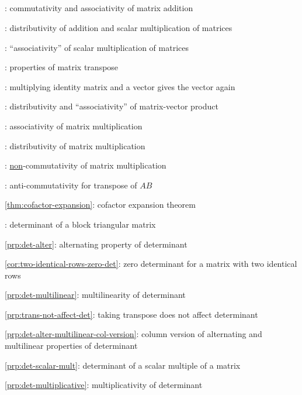 \subsection*{}
\item {}: commutativity and associativity of
matrix addition
\item {}: distributivity of addition
and scalar multiplication of matrices
\item {}: ``associativity'' of scalar multiplication of matrices
\item {}: properties of matrix transpose
\item {}: multiplying identity matrix and a vector gives the vector again
\item {}: distributivity and ``associativity'' of matrix-vector product
\item {}: associativity of matrix multiplication
\item {}: distributivity of matrix multiplication
\item {}: \underline{non}-commutativity of matrix multiplication
\item {}: anti-commutativity for transpose of \(AB\)
\item \cref{thm:cofactor-expansion}: cofactor expansion theorem
\item {}: determinant of a block triangular matrix
\item \cref{prp:det-alter}: alternating property of determinant
\item \cref{cor:two-identical-rows-zero-det}: zero determinant for a matrix with two identical rows
\item \cref{prp:det-multilinear}: multilinearity of determinant
\item \cref{prp:trans-not-affect-det}: taking transpose does not affect determinant
\item \cref{prp:det-alter-multilinear-col-version}: column version of alternating and multilinear properties of determinant
\item \cref{prp:det-scalar-mult}: determinant of a scalar multiple of a matrix
\item \cref{prp:det-multiplicative}: multiplicativity of determinant
